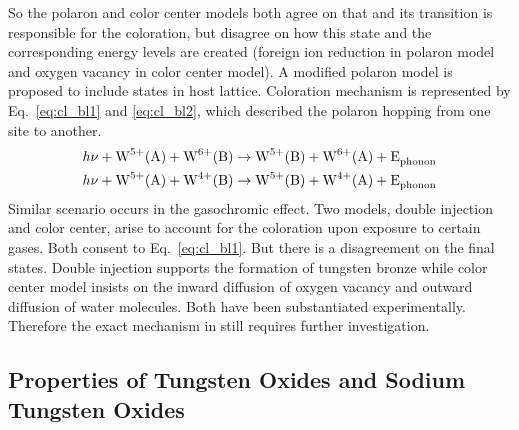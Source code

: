 So the polaron and color center models both agree on that  and its transition is responsible for the coloration, but disagree on how this  state and the corresponding energy levels are created (foreign ion reduction in polaron model and oxygen vacancy in color center model). A modified polaron model is proposed to include  states in host lattice. Coloration mechanism is represented by Eq.~\ref{eq:cl_bl1} and \ref{eq:cl_bl2}, which described the polaron hopping from one site to another.\cite{Chatten2005}
\begin{align}
h\nu +\ce{W^{5+}(A)} +  \ce{W^{6+}(B)} &\rightarrow \ce{W^{5+}(B)} + \ce{W^{6+}(A) + E_{phonon}} \label{eq:cl_bl1}\\
h\nu +\ce{W^{5+}(A)} +  \ce{W^{4+}(B)} &\rightarrow \ce{W^{5+}(B)} + \ce{W^{4+}(A) + E_{phonon}} \label{eq:cl_bl2}
\end{align}
Similar scenario occurs in the gasochromic effect. Two models, double injection and color center, arise to account for the coloration upon exposure to certain gases. Both consent to Eq.~\ref{eq:cl_bl1}. But there is a disagreement on the final states. Double injection supports the formation of tungsten bronze  while color center model insists on the inward diffusion of oxygen vacancy and outward diffusion of water molecules. Both have been substantiated experimentally. Therefore the exact mechanism in  still requires further investigation.

\iffalse
The author believe the resolution to a large extent depends on the phase transitions, as discussed in Section.~\ref{sec:wonawo}.

A thin film example on the valency number, color center density. some calculation on doping, uv-vis results on the thin film. 

\fi

\subsection{Properties of Tungsten Oxides and Sodium Tungsten Oxides}\label{sec:wonawo}

